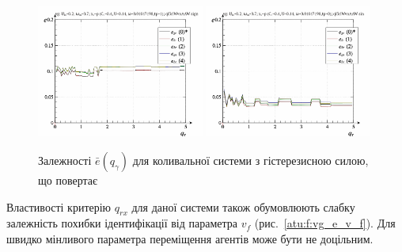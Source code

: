 \begin{figure}[ht!]
\begin{center}
  \includegraphics[width=0.49\textwidth]{p/cha/vg/vg_id-p_q_gamma_sign.png}
  \hfill
  \includegraphics[width=0.49\textwidth]{p/cha/vg/vg_id-p_q_gamma_sin.png}
\end{center}
  \caption{Залежності $\bar{e}(q_\gamma)$ для коливальної системи з гістерезисною силою, що повертає}
\label{atu:f:vg_e_q_gamma}
\end{figure}

Властивості критерію
$ q_{rx} $ для даної системи також обумовлюють слабку залежність
похибки ідентифікації від параметра
$ v_f $ (рис.~\ref{atu:f:vg_e_v_f}).
Для швидко мінливого параметра переміщення агентів може бути не доцільним.

